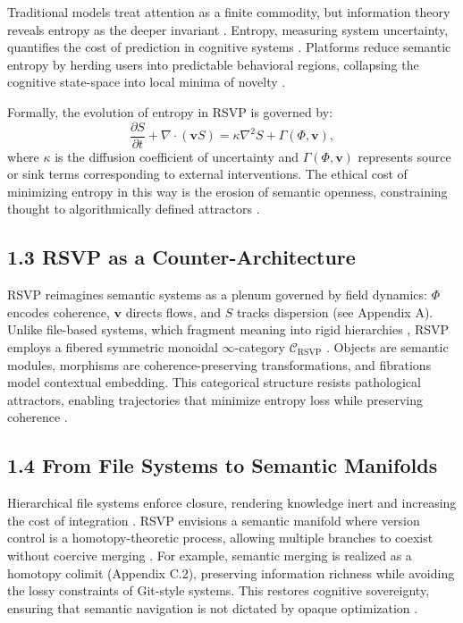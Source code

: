 \documentclass[12pt]{article}
\begin{document}
Traditional models treat attention as a finite commodity, but information theory reveals entropy as the deeper invariant \citep{cover2006}. Entropy, measuring system uncertainty, quantifies the cost of prediction in cognitive systems \citep{shannon1948}. Platforms reduce semantic entropy by herding users into predictable behavioral regions, collapsing the cognitive state-space into local minima of novelty \citep{jaynes2003}.

Formally, the evolution of entropy in RSVP is governed by:
\[
\frac{\partial S}{\partial t} + \nabla \cdot (\mathbf{v} S) = \kappa \nabla^2 S + \Gamma(\Phi, \mathbf{v}),
\]
where \(\kappa\) is the diffusion coefficient of uncertainty and \(\Gamma(\Phi, \mathbf{v})\) represents source or sink terms corresponding to external interventions. The ethical cost of minimizing entropy in this way is the erosion of semantic openness, constraining thought to algorithmically defined attractors \citep{deleuze1987}.

\subsection{1.3 RSVP as a Counter-Architecture}

RSVP reimagines semantic systems as a plenum governed by field dynamics: \(\Phi\) encodes coherence, \(\mathbf{v}\) directs flows, and \(S\) tracks dispersion (see Appendix A). Unlike file-based systems, which fragment meaning into rigid hierarchies \citep{bird1988}, RSVP employs a fibered symmetric monoidal \(\infty\)-category \(\mathcal{C}_{\text{RSVP}}\) \citep{maclane1998}. Objects are semantic modules, morphisms are coherence-preserving transformations, and fibrations model contextual embedding. This categorical structure resists pathological attractors, enabling trajectories that minimize entropy loss while preserving coherence \citep{baez2011}.

\subsection{1.4 From File Systems to Semantic Manifolds}

Hierarchical file systems enforce closure, rendering knowledge inert and increasing the cost of integration \citep{whitehead1978}. RSVP envisions a semantic manifold where version control is a homotopy-theoretic process, allowing multiple branches to coexist without coercive merging \citep{hatcher2002}. For example, semantic merging is realized as a homotopy colimit (Appendix C.2), preserving information richness while avoiding the lossy constraints of Git-style systems. This restores cognitive sovereignty, ensuring that semantic navigation is not dictated by opaque optimization \citep{ortega1957}.
\end{document}
